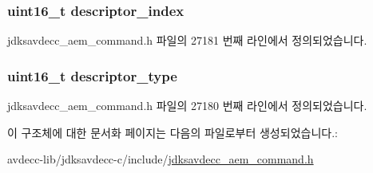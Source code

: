 \subsubsection[{\texorpdfstring{descriptor\+\_\+index}{descriptor_index}}]{\setlength{\rightskip}{0pt plus 5cm}uint16\+\_\+t descriptor\+\_\+index}\hypertarget{structjdksavdecc__aem__command__reboot__response_a042bbc76d835b82d27c1932431ee38d4}{}\label{structjdksavdecc__aem__command__reboot__response_a042bbc76d835b82d27c1932431ee38d4}


jdksavdecc\+\_\+aem\+\_\+command.\+h 파일의 27181 번째 라인에서 정의되었습니다.

\subsubsection[{\texorpdfstring{descriptor\+\_\+type}{descriptor_type}}]{\setlength{\rightskip}{0pt plus 5cm}uint16\+\_\+t descriptor\+\_\+type}\hypertarget{structjdksavdecc__aem__command__reboot__response_ab7c32b6c7131c13d4ea3b7ee2f09b78d}{}\label{structjdksavdecc__aem__command__reboot__response_ab7c32b6c7131c13d4ea3b7ee2f09b78d}


jdksavdecc\+\_\+aem\+\_\+command.\+h 파일의 27180 번째 라인에서 정의되었습니다.



이 구조체에 대한 문서화 페이지는 다음의 파일로부터 생성되었습니다.\+:\begin{DoxyCompactItemize}
\item 
avdecc-\/lib/jdksavdecc-\/c/include/\hyperlink{jdksavdecc__aem__command_8h}{jdksavdecc\+\_\+aem\+\_\+command.\+h}\end{DoxyCompactItemize}
